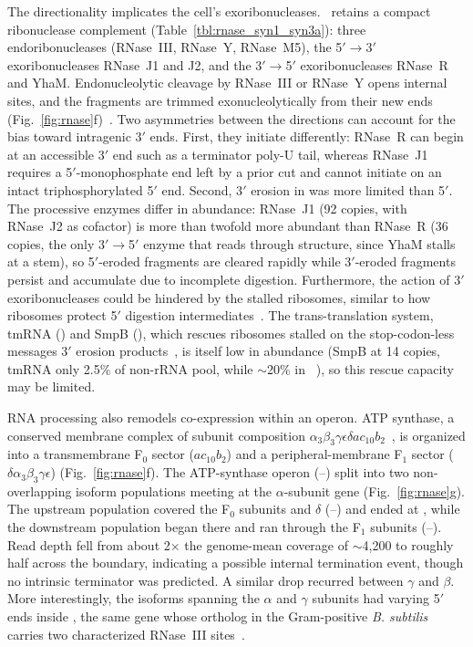 The directionality implicates the cell's exoribonucleases.
\syn~retains a compact ribonuclease complement (Table~\ref{tbl:rnase_syn1_syn3a}): three endoribonucleases (RNase~III, RNase~Y, RNase~M5), the 5$'\rightarrow$3$'$ exoribonucleases RNase~J1 and J2, and the 3$'\rightarrow$5$'$ exoribonucleases RNase~R and YhaM.
Endonucleolytic cleavage by RNase~III or RNase~Y opens internal sites, and the fragments are trimmed exonucleolytically from their new ends (Fig.~\ref{fig:rnase}f)~\cite{durand_rnases_2018}.
Two asymmetries between the directions can account for the bias toward intragenic 3$'$ ends.
First, they initiate differently: RNase~R can begin at an accessible 3$'$ end such as a terminator poly-U tail, whereas RNase~J1 requires a 5$'$-monophosphate end left by a prior cut and cannot initiate on an intact triphosphorylated 5$'$ end.
Second, 3$'$ erosion in \syn was more limited than 5$'$. The processive enzymes differ in abundance: RNase~J1 (92 copies, with RNase~J2 as cofactor) is more than twofold more abundant than RNase~R (36 copies, the only 3$'\rightarrow$5$'$ enzyme that reads through structure, since YhaM stalls at a stem), so 5$'$-eroded fragments are cleared rapidly while 3$'$-eroded fragments persist and accumulate due to incomplete digestion.
Furthermore, the action of 3$'$ exoribonucleases could be hindered by the stalled ribosomes, similar to how ribosomes protect 5$'$ digestion intermediates~\cite{huch_atlas_2023}. The trans-translation system, tmRNA () and SmpB (), which rescues ribosomes stalled on the stop-codon-less messages 3$'$ erosion products~\cite{janssen_tmrna_2012}, is itself low in abundance (SmpB at 14 copies, tmRNA only 2.5\% of non-rRNA pool, while $\sim$20\% in \Eco~\cite{riquelme-barrios_direct_2025}), so this rescue capacity may be limited.

RNA processing also remodels co-expression within an operon.
ATP synthase, a conserved membrane complex of subunit composition $\alpha_3\beta_3\gamma\epsilon\delta ac_{10}b_{2}$~\cite{fu_assembly_2026}, is organized into a transmembrane F$_0$ sector ($ac_{10}b_{2}$) and a peripheral-membrane F$_1$ sector ($\delta\alpha_3\beta_3\gamma\epsilon$) (Fig.~\ref{fig:rnase}f).
The ATP-synthase operon (--) split into two non-overlapping isoform populations meeting at the $\alpha$-subunit gene  (Fig.~\ref{fig:rnase}g).
The upstream population covered the F$_0$ subunits and $\delta$ (--) and ended at , while the downstream population began there and ran through the F$_1$ subunits (--).
Read depth fell from about 2$\times$ the genome-mean coverage of $\sim$4{,}200 to roughly half across the boundary, indicating a possible internal termination event, though no intrinsic terminator was predicted.
A similar drop recurred between $\gamma$ and $\beta$.
More interestingly, the isoforms spanning the $\alpha$ and $\gamma$ subunits had varying 5$'$ ends inside , the same gene whose ortholog in the Gram-positive \textit{B. subtilis} carries two characterized RNase~III sites~\cite{taggart_high-resolution_2025}.

